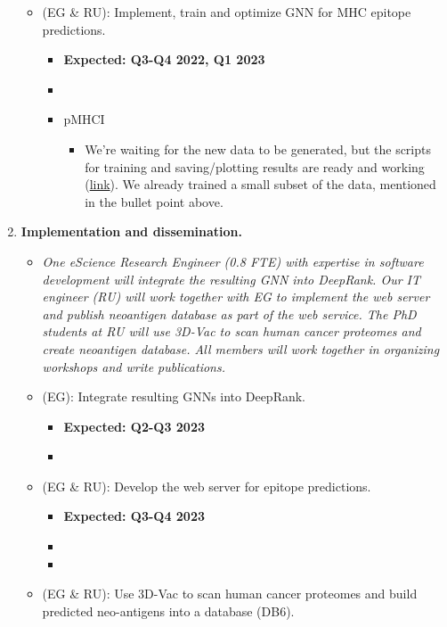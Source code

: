 \begin{enumerate}[start=0,label={\bfseries \ding{118} Task \arabic*:}]
\begin{itemize}
\begin{itemize}
\begin{itemize}
\end{itemize}
\end{itemize}
\item (EG \& RU): Implement, train and optimize GNN for MHC epitope predictions.
\begin{itemize}
\item \textbf{Expected: Q3-Q4 2022, Q1 2023}
\item {}
\item pMHCI
\begin{itemize}
\item We're waiting for the new data to be generated, but the scripts for training and saving/plotting
results are ready and working
(\href{https://github.com/DeepRank/3D-Vac/tree/gcroci2_105_regenerate_hdf5_new_data/src/4_train_models/GNN/I/classification/struct}{link}).
We already trained a small subset of the data, mentioned in the bullet point above.
\end{itemize}
\end{itemize}
\end{itemize}
\item \textbf{Implementation and dissemination.}
\begin{itemize}
\item \textit{One eScience Research Engineer (0.8 FTE) with expertise in software development will integrate the resulting GNN
into DeepRank. Our IT engineer (RU) will work together with EG to implement the web server and publish neoantigen
database as part of the web service. The PhD students at RU will use 3D-Vac to scan human cancer proteomes and create
neoantigen database. All members will work together in organizing workshops and write publications.}
\item (EG): Integrate resulting GNNs into DeepRank.
\begin{itemize}
\item \textbf{Expected: Q2-Q3 2023}
\item {}
\end{itemize}
\item (EG \& RU): Develop the web server for epitope predictions.
\begin{itemize}
\item \textbf{Expected: Q3-Q4 2023}
\item {}
\item {}
\end{itemize}
\item (EG \& RU): Use 3D-Vac to scan human cancer proteomes and build predicted neo-antigens into a database (DB6).

\end{itemize}
\end{enumerate}
